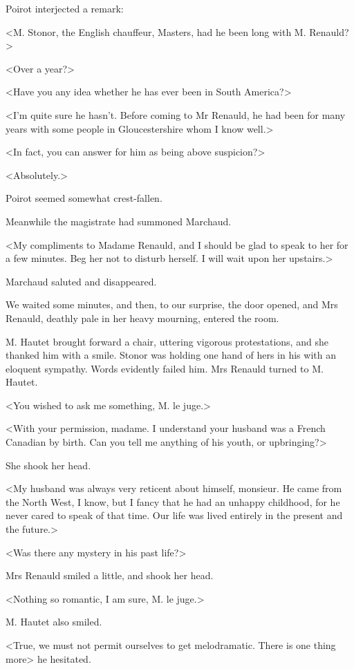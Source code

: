  Poirot interjected a remark: 

 <M. Stonor, the English chauffeur, Masters, had he been long with M. Renauld?> 

 <Over a year?> 

 <Have you any idea whether he has ever been in South America?> 

 <I'm quite sure he hasn't. Before coming to Mr Renauld, he had been for many years with some people in Gloucestershire whom I know well.> 

 <In fact, you can answer for him as being above suspicion?> 

 <Absolutely.> 

 Poirot seemed somewhat crest-fallen. 

 Meanwhile the magistrate had summoned Marchaud. 

 <My compliments to Madame Renauld, and I should be glad to speak to her for a few minutes. Beg her not to disturb herself. I will wait upon her upstairs.> 

 Marchaud saluted and disappeared. 

 We waited some minutes, and then, to our surprise, the door opened, and Mrs Renauld, deathly pale in her heavy mourning, entered the room. 

 M. Hautet brought forward a chair, uttering vigorous protestations, and she thanked him with a smile. Stonor was holding one hand of hers in his with an eloquent sympathy. Words evidently failed him. Mrs Renauld turned to M. Hautet. 

 <You wished to ask me something, M. le juge.> 

 <With your permission, madame. I understand your husband was a French Canadian by birth. Can you tell me anything of his youth, or upbringing?> 

 She shook her head. 

 <My husband was always very reticent about himself, monsieur. He came from the North West, I know, but I fancy that he had an unhappy childhood, for he never cared to speak of that time. Our life was lived entirely in the present and the future.> 

 <Was there any mystery in his past life?> 

 Mrs Renauld smiled a little, and shook her head. 

 <Nothing so romantic, I am sure, M. le juge.> 

 M. Hautet also smiled. 

 <True, we must not permit ourselves to get melodramatic. There is one thing more\longdash> he hesitated. 

